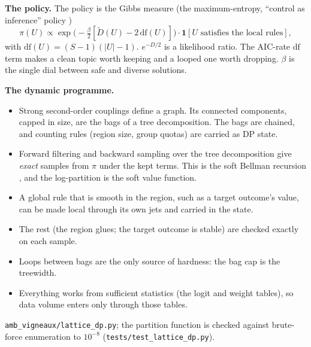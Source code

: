 \documentclass[11pt]{article}
\theoremstyle{definition}
\theoremstyle{remark}
\begin{document}
\textbf{The policy.} The policy is the Gibbs measure (the maximum-entropy, ``control as inference'' policy \cite{levine18})
\[ \pi(U)\propto\exp\bigl(-\tfrac\beta2[\tilde D(U)-2\,\mathrm{df}(U)]\bigr)\cdot\mathbf 1[U\text{ satisfies the local rules}], \]
with $\mathrm{df}(U)=(S-1)(|U|-1)$. $e^{-D/2}$ is a likelihood ratio. The AIC-rate $\mathrm{df}$ term makes a clean topic worth keeping and a looped one worth dropping. $\beta$ is the single dial between safe and diverse solutions.

\textbf{The dynamic programme.}
\begin{itemize}
  \item Strong second-order couplings define a graph. Its connected components, capped in size, are the bags of a tree decomposition. The bags are chained, and counting rules (region size, group quotas) are carried as DP state.
  \item Forward filtering and backward sampling \cite{carterkohn94,fruhwirth94} over the tree decomposition \cite{lauritzen88} give \emph{exact} samples from $\pi$ under the kept terms. This is the soft Bellman recursion \cite{bellman57,levine18}, and the log-partition is the soft value function.
  \item A global rule that is smooth in the region, such as a target outcome's value, can be made local through its own jets and carried in the state.
  \item The rest (the region glues; the target outcome is stable) are checked exactly on each sample.
  \item Loops between bags are the only source of hardness: the bag cap is the treewidth.
  \item Everything works from sufficient statistics (the logit and weight tables), so data volume enters only through those tables.
\end{itemize}
\texttt{amb\_vigneaux/lattice\_dp.py}; the partition function is checked against brute-force enumeration to $10^{-8}$ (\texttt{tests/test\_lattice\_dp.py}).
\end{document}
